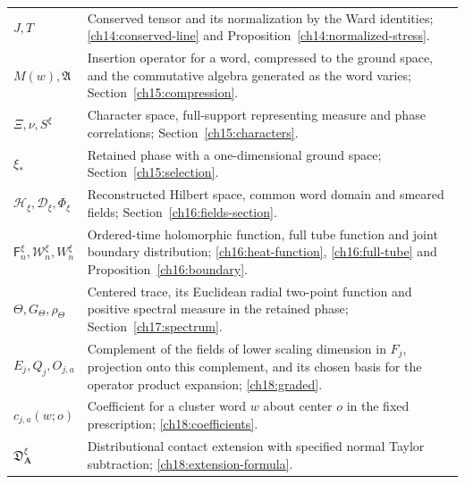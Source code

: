 {\begin{longtable}{@{}p{}p{}@{}}
$J,T$ & Conserved tensor and its normalization by the Ward identities; \eqref{ch14:conserved-line} and Proposition~\ref{ch14:normalized-stress}.\\[2pt]
$M(w),\mathfrak A$ & Insertion operator for a word, compressed to the ground space, and the commutative algebra generated as the word varies; Section~\ref{ch15:compression}.\\[2pt]
$\Xi,\nu,S^\xi$ & Character space, full-support representing measure and phase correlations; Section~\ref{ch15:characters}.\\[2pt]
$\xi_*$ & Retained phase with a one-dimensional ground space; Section~\ref{ch15:selection}.\\
$\mathcal H_\xi,\mathcal D_\xi,\Phi_\xi$ & Reconstructed Hilbert space, common word domain and smeared fields; Section~\ref{ch16:fields-section}.\\[2pt]
$\mathsf F_n^\xi,\mathcal W_n^\xi,W_n^\xi$ & Ordered-time holomorphic function, full tube function and joint boundary distribution; \eqref{ch16:heat-function}, \eqref{ch16:full-tube} and Proposition~\ref{ch16:boundary}.\\[2pt]
$\Theta,G_\Theta,\rho_\Theta$ & Centered trace, its Euclidean radial two-point function and positive spectral measure in the retained phase; Section~\ref{ch17:spectrum}.\\[2pt]
$E_j,Q_j,O_{j,a}$ & Complement of the fields of lower scaling dimension in $F_j$, projection onto this complement, and its chosen basis for the operator product expansion; \eqref{ch18:graded}.\\[2pt]
$c_{j,a}(w;o)$ & Coefficient for a cluster word $w$ about center $o$ in the fixed prescription; \eqref{ch18:coefficients}.\\[2pt]
$\mathfrak D_{\boldsymbol A}^\xi$ & Distributional contact extension with specified normal Taylor subtraction; \eqref{ch18:extension-formula}.\\
\bottomrule
\end{longtable}
}
